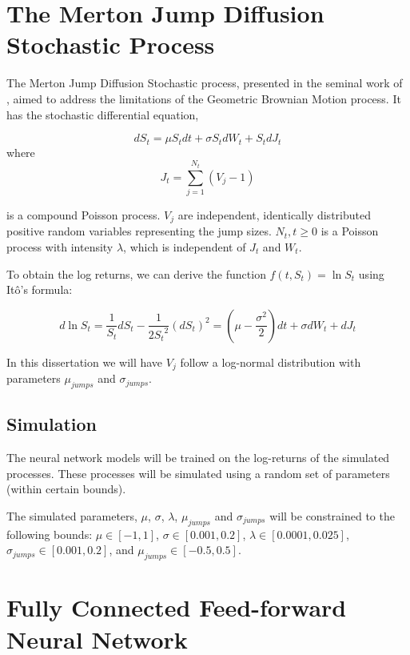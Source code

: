 \documentclass[11pt,oneside,openany,a4paper,english, report, goldenblock
]{usthesis}
\begin{document}
\section{The Merton Jump Diffusion Stochastic Process}

The Merton Jump Diffusion Stochastic process, presented in the seminal work of \citet{Merton}, aimed to address the limitations of the Geometric Brownian Motion process. It has the stochastic differential equation,

\begin{equation}
d S_t =  \mu S_t dt  +\sigma S_t dW_t + S_t dJ_t 
\end{equation}
where
\begin{equation}
J_t = \sum_{j=1}^{N_t}(V_j - 1)
\end{equation}

is a compound Poisson process. $V_j$ are independent, identically distributed positive random variables representing the jump sizes. $N_t, t \geq 0$ is a Poisson process with intensity $\lambda$, which is independent of $J_t$ and $W_t$.

To obtain the log returns, we can derive the function $f(t, S_t) = \ln{S_t}$ using It\^{o}'s formula:

\begin{equation} \label{equation:merton_log_returns}
d\ln{S_t} = \frac{1}{S_t}dS_t - \frac{1}{2{S_t}^2}\left(dS_t\right)^2 = \left( \mu - \frac{\sigma^2}{2} \right)dt +\sigma dW_t + dJ_t 
\end{equation}

In this dissertation we will have $V_j$ follow a log-normal distribution with parameters $\mu_{jumps}$ and $\sigma_{jumps}$.

\subsection{Simulation}
The neural network models will be trained on the log-returns of the simulated processes. These processes will be simulated using a random set of parameters (within certain bounds).

The simulated parameters, $\mu$, $\sigma$, $\lambda$, $\mu_{jumps}$ and $\sigma_{jumps}$ will be constrained to the following bounds: $\mu \in [-1, 1]$, $\sigma \in [0.001, 0.2]$, $\lambda\in [0.0001, 0.025]$, $\sigma_{jumps} \in [0.001, 0.2]$, and $\mu_{jumps}\in [-0.5, 0.5]$.

\section{Fully Connected Feed-forward Neural Network}
\end{document}
